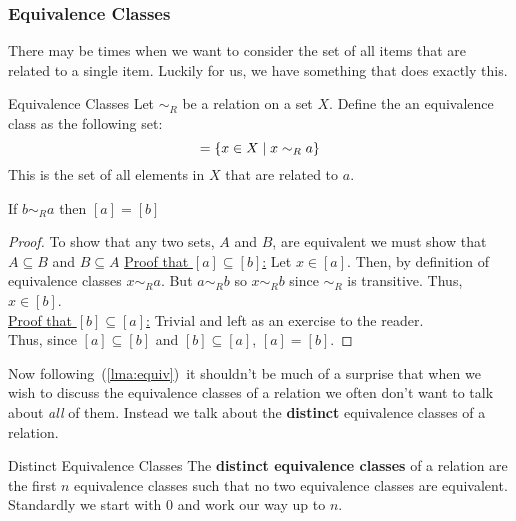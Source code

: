 \subsubsection{Equivalence Classes}
There may be times when we want to consider the set of all items that are related to a single item. Luckily for us, we have something that does exactly this.

\begin{definition}{Equivalence Classes}{}
    Let $\sim_R$ be a relation on a set $X$. Define the an equivalence class as the following set:
    \begin{equation*}
        [a] = \braces{ x \in X \mid x \sim_R a}
    \end{equation*}
    This is the set of all elements in $X$ that are related to $a$.
\end{definition}

\begin{tcolorbox}[colback=yellow!60]
\begin{lemma}\label{lma:equiv}
    If $b \sim_R a$ then $[a] = [b]$
\end{lemma}
\begin{proof}
    To show that any two sets, $A$ and $B$, are equivalent we must show that $A \subseteq B$ and $B \subseteq A$
    \hspace*{2em} \underline{Proof that $[a] \subseteq [b]$:} Let $x \in [a]$. Then, by definition of equivalence classes $x \sim_R a$. But $a \sim_R b$ so $x \sim_R b$ since $\sim_R$ is transitive. Thus, $x \in [b]$. \\
    \hspace*{2em} \underline{Proof that $[b] \subseteq [a]$:} Trivial and left as an exercise to the reader. \\
    Thus, since $[a] \subseteq [b]$ and $[b] \subseteq [a]$, $[a] = [b]$.
\end{proof}
\end{tcolorbox}

Now following~(\ref{lma:equiv})~it shouldn't be much of a surprise that when we wish to discuss the equivalence classes of a relation we often don't want to talk about \textit{all} of them. Instead we talk about the \textbf{distinct} equivalence classes of a relation. 
\begin{definition}{Distinct Equivalence Classes}{}
    The \textbf{distinct equivalence classes} of a relation are the first $n$ equivalence classes such that no two equivalence classes are equivalent. Standardly we start with $0$ and work our way up to $n$.
\end{definition}

